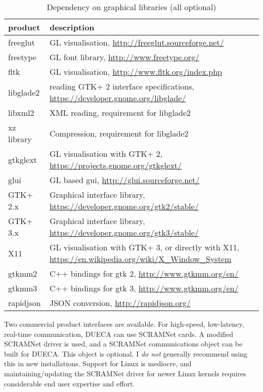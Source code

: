 \documentclass[11pt,a4paper,twoside]{scrreprt}
\newcommand{\PBS}[1]{\let\temp=\\#1\let\\=\temp}
\begin{document}
\begin{table}
  \caption{Dependency on graphical libraries (all optional)}
  \begin{tabularx}{\textwidth}{l>{\PBS{\raggedright}}X}\hline\hline
    product & description \\ \hline
    freeglut & GL visualisation, \url{http://freeglut.sourceforge.net/} \\
    freetype & GL font library, \url{http://www.freetype.org/} \\
    fltk & GL visualisation, \url{http://www.fltk.org/index.php} \\
    libglade2 & reading GTK+ 2 interface specifications, \url{https://developer.gnome.org/libglade/} \\
    libxml2 & XML reading, requirement for libglade2 \\
    xz library & Compression, requirement for libglade2 \\
    gtkglext & GL visualisation with GTK+ 2, \url{https://projects.gnome.org/gtkglext/} \\
    glui & GL based gui, \url{http://glui.sourceforge.net/} \\
    GTK+ 2.x & Graphical interface library, \url{https://developer.gnome.org/gtk2/stable/} \\
    GTK+ 3.x & Graphical interface library, \url{https://developer.gnome.org/gtk3/stable/} \\
    X11 & GL visualisation with GTK+ 3, or directly with X11, \url{https://en.wikipedia.org/wiki/X_Window_System} \\
    gtkmm2 & C++ bindings for gtk 2, \url{http://www.gtkmm.org/en/} \\
    gtkmm3 & C++ bindings for gtk 3, \url{http://www.gtkmm.org/en/} \\
    rapidjson & JSON conversion, \url{http://rapidjson.org/} \\
  \end{tabularx}
\end{table}

Two commercial product interfaces are available. For high-speed, low-latency, real-time communication, DUECA can use SCRAMNet cards. A modified SCRAMNet driver is used, and a SCRAMNet communications object can be built for DUECA. This object is optional. I \emph{do not} generally recommend using this in new installations. Support for Linux is mediocre, and maintaining/updating the SCRAMNet driver for newer Linux kernels requires considerable end user expertise and effort.
\end{document}
